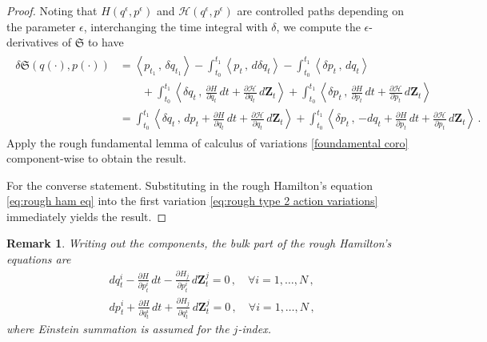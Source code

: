 \documentclass[11pt, oneside]{article}
\numberwithin{equation}{section}
\newtheorem{remark}{Remark}[section]
\theoremstyle{definition}
\newcommand{\mc}[1]{\mathcal{#1}}
\newcommand{\mcal}[1]{\mc{#1}}
\newcommand{\scp}[2]{{\left\langle {#1}\, , \, {#2}\right\rangle}}
\def\p{{\partial}}
\def\eps{{\epsilon}}
\def\p{\partial}
\begin{document}
\begin{proof}
Noting that $H(q^\eps, p^\eps)$ and $\mcal{H}(q^\eps, p^\eps)$ are controlled paths depending on the parameter $\eps$, interchanging the time integral with $\delta$, we compute the $\epsilon$-derivatives of $\mathfrak{S}$ to have
    \begin{align}
        \begin{split}
            \delta \mathfrak{S}(q(\cdot), p(\cdot)) &= \scp{p_{t_1}}{\delta q_{t_1}} - \int_{t_0}^{t_1} \scp{p_t}{d \delta q_t} - \int_{t_0}^{t_1}\scp{\delta p_t}{d q_t}\\
            & \qquad + \int_{t_0}^{t_1} \scp{\delta q_t}{\frac{\p H}{\p q_t}\,dt + \frac{\p \mcal{H}}{\p q_t}\,d\mathbf{Z}_t } + \int_{t_0}^{t_1} \scp{\delta p_t}{\frac{\p H}{\p p_t}\,dt + \frac{\p \mcal{H}}{\p p_t}\,d\mathbf{Z}_t }\\
            & =  \int_{t_0}^{t_1} \scp{\delta q_t}{d p_t + \frac{\p H}{\p q_t}\,dt + \frac{\p \mcal{H}}{\p q_t}\,d\mathbf{Z}_t } + \int_{t_0}^{t_1} \scp{\delta p_t}{- d q_t + \frac{\p H}{\p p_t}\,dt + \frac{\p \mcal{H}}{\p p_t}\,d\mathbf{Z}_t }\,.
        \end{split}
    \end{align}
    Apply the rough fundamental lemma of calculus of variations \ref{foundamental coro} component-wise to obtain the result. 

    For the converse statement. Substituting in the rough Hamilton's equation \eqref{eq:rough ham eq} into the first variation \eqref{eq:rough type 2 action variations} immediately yields the result.
\end{proof}
\begin{remark}
    Writing out the components, the bulk part of the rough Hamilton's equations are
    \begin{align*}
        &dq^i_t - \frac{\p H}{\p p^i_t}\,dt -\frac{\p H_j}{\p p^i_t}\, d\mathbf{Z}^j_t = 0\,, \quad \forall i = 1,\ldots, N\,,\\
        &d p^i_t + \frac{\p H}{\p q^i_t}\,dt + \frac{\p H_j}{\p q^i_t}\, d\mathbf{Z}^j_t  = 0\,, \quad \forall i = 1,\ldots, N\,,
    \end{align*}
    where Einstein summation is assumed for the $j$-index.
\end{remark}
\end{document}
